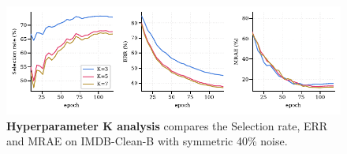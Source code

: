 \documentclass{article}
\theoremstyle{plain}
\theoremstyle{definition}
\theoremstyle{remark}
\begin{document}
\begin{figure}[th]
\begin{center}
\centerline{\includegraphics[width=\textwidth]{imgs/hp_analysis_imdb_k.pdf}}
\vskip -0.15in
\caption{
    \textbf{Hyperparameter K analysis} compares the Selection rate, ERR and MRAE on IMDB-Clean-B with symmetric 40\% noise.}
    \label{fig:analysis_imdb_k}
\vskip -0.15in
\end{center}
\end{figure}
\end{document}
